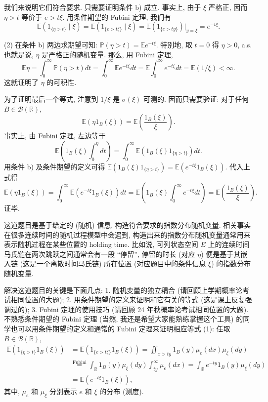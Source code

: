 \begin{enumerate}
\begin{proofc}[证明]
        我们来说明它们符合要求. 只需要证明条件 b) 成立. 
        事实上, 由于 $\xi$ 严格正, 因而 $\eta>t$ 等价于 $e>t\xi$. 
        用条件期望的 Fubini 定理, 我们有
        \[
            \mathbb E(1_{\{\eta>t\}}\mid \xi)
            =\mathbb E(1_{\{e>t\xi\}}\mid \xi)
            =\mathbb E(1_{\{e>ty\}})|_{y=\xi}=e^{-t\xi}.
        \]

        (2) 在条件 b) 两边求期望可知: $\mathbb P(\eta>t)=\mathbb E e^{-t\xi}$. 
        特别地, 取 $t=0$ 得 $\eta>0$, a.s. 也就是说, $\eta$ 是严格正的随机变量. 那么, 用 Fubini 定理,
        \[
            \mathbb E\eta=\int_0^\infty\mathbb P(\eta>t)dt
            =\int_0^\infty\mathbb E e^{-t\xi}dt
            =\mathbb E\int_0^\infty e^{-t\xi}dt
            =\mathbb E(1/\xi)<\infty.
        \]
        这就证明了 $\eta$ 的可积性.

        为了证明最后一个等式, 注意到 $1/\xi$ 是 $\sigma(\xi)$ 可测的. 
        因而只需要验证: 对于任何 $B\in\mathcal B(\mathbb R)$,
        \[
            \mathbb E(\eta 1_B(\xi))=\mathbb E\left(\frac{1_B(\xi)}{\xi}\right). \tag{1}
        \]
        事实上, 由 Fubini 定理, 左边等于
        \[
            \mathbb E\left(1_B(\xi)\int_0^\eta dt\right)
            =\int_0^\infty \mathbb E(1_B(\xi)1_{\{\eta>t\}})dt.
        \]
        用条件 b) 及条件期望的定义可得
        $\mathbb E(1_B(\xi)1_{\{\eta>t\}})=\mathbb E(e^{-t\xi}1_B(\xi))$.
        代入上式得
        \[
            \mathbb E(\eta 1_B(\xi))
            =\int_0^\infty \mathbb E(e^{-t\xi}1_B(\xi))dt
            =\mathbb E\left(1_B(\xi)\int_0^\infty e^{-t\xi}dt\right)
            =\mathbb E\left(\frac{1_B(\xi)}{\xi}\right).
        \]
        证毕.

        这道题目是基于给定的 (随机) 信息, 构造符合要求的指数分布随机变量. 相关事实在很多连续时间的随机过程模型中会遇到, 构造出来的指数分布随机变量通常用来表示随机过程在某些位置的 holding time. 比如说, 可列状态空间 $E$ 上的连续时间马氏链在两次跳跃之间通常会有一段 “停留”, 停留的时长 (对应 $\eta$) 便是基于其嵌入链 (这是一个离散时间马氏链) 所在位置 (对应题目中的条件信息 $\xi$) 的指数分布随机变量. 
        
        解决这道题目的关键是下面几点: 1. 随机变量的独立耦合 (请回顾上学期概率论考试相同位置的大题); 2. 用条件期望的定义来证明和它有关的等式 (这是课上反复强调过的); 3. Fubini 定理的使用技巧 (请回顾 24 年秋概率论考试相同位置的大题). 不熟悉条件期望的 Fubini 定理 (当然, 我还是希望大家能熟练掌握这个工具) 的同学也可以用条件期望的定义和通常的 Fubini 定理来证明相应等式 (1): 
        任取 $B\in\mathcal B(\mathbb R)$, \[ \begin{aligned} \mathbb E(1_{\{\eta>t\}}1_B(\xi)) &=\mathbb E(1_{\{e>t\xi\}}1_B(\xi)) =\iint_{x>ty}1_B(y)\mu_e(dx)\mu_\xi(dy)\\ &\overset{\mathrm{Fubini}}{=} \int_{\mathbb R}1_B(y)\mu_\xi(dy)\int_{ty}^\infty \mu_e(dx) =\int_{\mathbb R}e^{-ty}1_B(y)\mu_\xi(dy)\\ &=\mathbb E(e^{-t\xi}1_B(\xi)), \end{aligned} \] 其中, $\mu_e$ 和 $\mu_\xi$ 分别表示 $e$ 和 $\xi$ 的分布 (测度). 
        

\end{proofc}
\end{enumerate}
